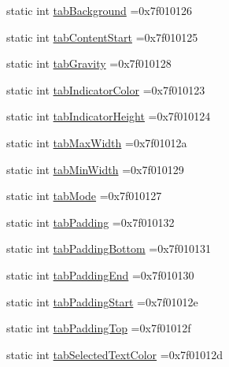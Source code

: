 \begin{DoxyCompactItemize}
\item 
static int \hyperlink{classandroid_1_1support_1_1graphics_1_1drawable_1_1R_1_1attr_a1c44addf7f395ec12808c6c7ed777643}{tab\+Background} =0x7f010126
\item 
static int \hyperlink{classandroid_1_1support_1_1graphics_1_1drawable_1_1R_1_1attr_a5d8570bb0ee91842cc6184b18c50dbf0}{tab\+Content\+Start} =0x7f010125
\item 
static int \hyperlink{classandroid_1_1support_1_1graphics_1_1drawable_1_1R_1_1attr_a7a3efaf74af3ebb75df29a9974ce9cd5}{tab\+Gravity} =0x7f010128
\item 
static int \hyperlink{classandroid_1_1support_1_1graphics_1_1drawable_1_1R_1_1attr_adad270cd3bde3f88c4601faeebbfdcd3}{tab\+Indicator\+Color} =0x7f010123
\item 
static int \hyperlink{classandroid_1_1support_1_1graphics_1_1drawable_1_1R_1_1attr_aaa97736be3c5d43414aa1b4b944a60cb}{tab\+Indicator\+Height} =0x7f010124
\item 
static int \hyperlink{classandroid_1_1support_1_1graphics_1_1drawable_1_1R_1_1attr_aa0854412018a70626e8a391429584e5c}{tab\+Max\+Width} =0x7f01012a
\item 
static int \hyperlink{classandroid_1_1support_1_1graphics_1_1drawable_1_1R_1_1attr_a36e5d7d56e7c107071e1f01fa7598843}{tab\+Min\+Width} =0x7f010129
\item 
static int \hyperlink{classandroid_1_1support_1_1graphics_1_1drawable_1_1R_1_1attr_aa537699ee277ef8fb9894bf05b8042df}{tab\+Mode} =0x7f010127
\item 
static int \hyperlink{classandroid_1_1support_1_1graphics_1_1drawable_1_1R_1_1attr_aabc68d7e331010857d70da2c496922bd}{tab\+Padding} =0x7f010132
\item 
static int \hyperlink{classandroid_1_1support_1_1graphics_1_1drawable_1_1R_1_1attr_a942c0b202e751ef1f231b4c34330478b}{tab\+Padding\+Bottom} =0x7f010131
\item 
static int \hyperlink{classandroid_1_1support_1_1graphics_1_1drawable_1_1R_1_1attr_a3e0d531c1c2dbbcffc5c21d76e2228f3}{tab\+Padding\+End} =0x7f010130
\item 
static int \hyperlink{classandroid_1_1support_1_1graphics_1_1drawable_1_1R_1_1attr_a0e6b87cd6e9cb402a00bdd2ae909c2bb}{tab\+Padding\+Start} =0x7f01012e
\item 
static int \hyperlink{classandroid_1_1support_1_1graphics_1_1drawable_1_1R_1_1attr_a50ac48b69c90f6ea0001c1bfb5dfcdbf}{tab\+Padding\+Top} =0x7f01012f
\item 
static int \hyperlink{classandroid_1_1support_1_1graphics_1_1drawable_1_1R_1_1attr_a56f2ab8b6e9676424ea637e219f12c28}{tab\+Selected\+Text\+Color} =0x7f01012d

\end{DoxyCompactItemize}
